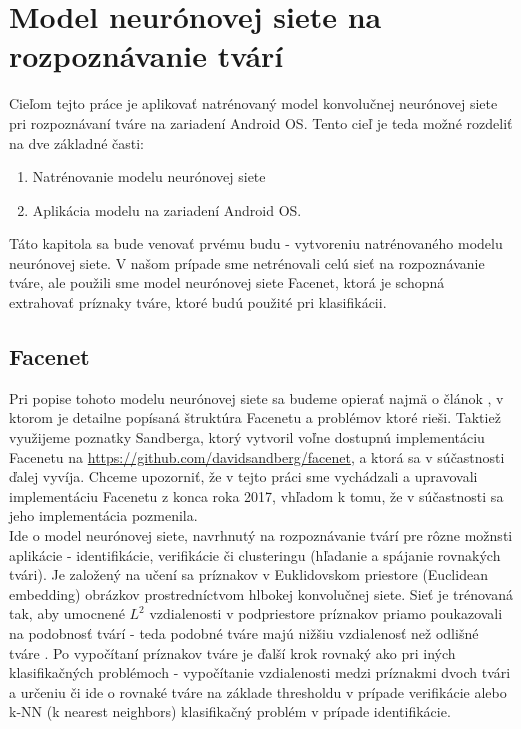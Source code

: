 \newpage 

\section{Model neurónovej siete na rozpoznávanie tvárí}
Cieľom tejto práce je aplikovať natrénovaný model konvolučnej neurónovej siete pri rozpoznávaní tváre na zariadení Android OS.
Tento cieľ je teda možné rozdeliť na dve základné časti:
\begin{enumerate}
	\item Natrénovanie modelu neurónovej siete
	\item Aplikácia modelu na zariadení Android OS.
\end{enumerate}

Táto kapitola sa bude venovať prvému budu - vytvoreniu natrénovaného modelu neurónovej siete.
V našom prípade sme netrénovali celú sieť na rozpoznávanie tváre, ale použili sme model neurónovej siete Facenet, ktorá je schopná extrahovať príznaky tváre, 
ktoré budú použité pri klasifikácii.

\subsection{Facenet}
Pri popise tohoto modelu neurónovej siete sa budeme opierať najmä o článok \cite{schroff2015facenet},
v ktorom je detailne popísaná štruktúra Facenetu a problémov ktoré rieši.
Taktiež využijeme poznatky Sandberga, ktorý vytvoril voľne dostupnú implementáciu Facenetu na \url{https://github.com/davidsandberg/facenet}, a ktorá sa v súčastnosti ďalej vyvíja.
Chceme upozorniť, že v tejto práci sme vychádzali a upravovali implementáciu Facenetu z konca roka 2017, vhľadom k tomu, že v súčastnosti sa jeho implementácia pozmenila.\\
 
\indent Ide o model neurónovej siete, navrhnutý na rozpoznávanie tvárí pre rôzne možnsti aplikácie - identifikácie, verifikácie či clusteringu (hľadanie a spájanie rovnakých tvári).
Je založený na učení sa príznakov v Euklidovskom priestore  (Euclidean embedding) obrázkov prostredníctvom hlbokej konvolučnej siete.
Sieť je trénovaná tak, aby umocnené $ L^2 $ vzdialenosti v podpriestore príznakov priamo poukazovali na podobnosť tvárí - teda podobné tváre majú nižšiu vzdialenosť než odlišné tváre \cite{schroff2015facenet}.
Po vypočítaní príznakov tváre je ďalší krok rovnaký ako pri iných klasifikačných problémoch - vypočítanie vzdialenosti medzi príznakmi dvoch tvári a určeniu či ide o rovnaké tváre na základe thresholdu v prípade verifikácie alebo k-NN (k nearest neighbors) klasifikačný problém v prípade identifikácie.\\


